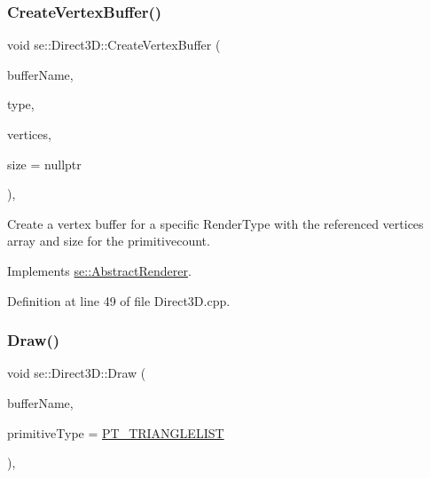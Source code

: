 \mbox{\label{classse_1_1_direct3_d_a52e0bbf13e8045dab39bb2ef34028a94}} 
\subsubsection{\texorpdfstring{Create\+Vertex\+Buffer()}{CreateVertexBuffer()}}
{\footnotesize\ttfamily void se\+::\+Direct3\+D\+::\+Create\+Vertex\+Buffer (\begin{DoxyParamCaption}\item[{const std\+::string \&}]{buffer\+Name,  }\item[{\mbox{\hyperlink{namespacese_a9ed62241331cac830c5c1ba8450afc2b}{Render\+Type}}}]{type,  }\item[{\mbox{\hyperlink{structse_1_1_vertex}{Vertex}} $\ast$}]{vertices,  }\item[{\mbox{\hyperlink{namespacese_ada11715de7cf6e87b5dfb4611fe68d29}{Vector3i}} $\ast$}]{size = {\ttfamily nullptr} }\end{DoxyParamCaption})\hspace{0.3cm}{\ttfamily [override]}, {\ttfamily [virtual]}}

Create a vertex buffer for a specific Render\+Type with the referenced vertices array and size for the primitivecount. 

Implements \mbox{\hyperlink{classse_1_1_abstract_renderer_a953d57d04771acae78c3725bee3639d4}{se\+::\+Abstract\+Renderer}}.



Definition at line 49 of file Direct3\+D.\+cpp.

\mbox{\label{classse_1_1_direct3_d_ac6d9e0950a4b58d716aa08b52f79a9ab}} 
\subsubsection{\texorpdfstring{Draw()}{Draw()}}
{\footnotesize\ttfamily void se\+::\+Direct3\+D\+::\+Draw (\begin{DoxyParamCaption}\item[{const std\+::string \&}]{buffer\+Name,  }\item[{\mbox{\hyperlink{namespacese_a2b33c0ed67b2f6ac40fc08d56b5984f9}{Primitive\+Type}}}]{primitive\+Type = {\ttfamily \mbox{\hyperlink{namespacese_a2b33c0ed67b2f6ac40fc08d56b5984f9ae5169632705e9235a4423477202499c1}{P\+T\+\_\+\+T\+R\+I\+A\+N\+G\+L\+E\+L\+I\+ST}}} }\end{DoxyParamCaption})\hspace{0.3cm}{\ttfamily [override]}, {\ttfamily [virtual]}}

